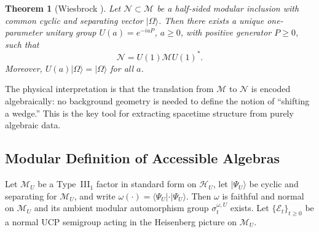 \documentclass[12pt,a4paper]{article}
\newtheorem{theorem}{Theorem}[section]
\begin{document}
\begin{theorem}[Wiesbrock {\cite{Wiesbrock1993}}]
\label{thm:Wiesbrock}
Let $\mathcal{N} \subset \mathcal{M}$ be a half-sided modular inclusion with common cyclic and separating vector $|\Omega\rangle$.
Then there exists a unique one-parameter unitary group $U(a) = e^{-iaP}$, $a \geq 0$, with positive generator $P \geq 0$, such that
\begin{equation}
\mathcal{N} = U(1)\mathcal{M} U(1)^*.
\end{equation}
Moreover, $U(a)|\Omega\rangle = |\Omega\rangle$ for all $a$.
\end{theorem}

The physical interpretation is that the translation from $\mathcal{M}$ to $\mathcal{N}$ is encoded algebraically: no background geometry is needed to define the notion of ``shifting a wedge.''
This is the key tool for extracting spacetime structure from purely algebraic data.


\subsection{Modular Definition of Accessible Algebras}
\label{sec:modular-def}

Let $\mathcal M_U$ be a Type~III$_1$ factor in standard form on $\mathcal H_U$, let $|\Psi_U\rangle$ be cyclic and separating for $\mathcal M_U$, and write $\omega(\cdot)=\langle\Psi_U|\cdot|\Psi_U\rangle$.  Then $\omega$ is faithful and normal on $\mathcal M_U$ and its ambient modular automorphism group $\sigma_t^{\omega,U}$ exists.  Let $\{\mathcal E_t\}_{t\ge0}$ be a normal UCP semigroup acting in the Heisenberg picture on $\mathcal M_U$.
\end{document}
